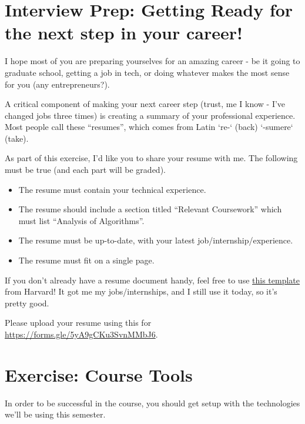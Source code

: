 \documentclass [12pt]{article}
\begin{document}

\pagebreak
\section{Interview Prep: Getting Ready for the next step in your career!}
 I hope most of you are preparing yourselves for an amazing career - be it going to graduate school, getting a job in tech, or doing whatever makes the most sense for you (any entrepreneurs?).

A critical component of making your next career step (trust, me I know - I've changed jobs three times) is creating a summary of your professional experience. Most people call these ``resumes'', which comes from Latin `re-` (back) `-sumere` (take).

As part of this exercise, I'd like you to share your resume with me. The following must be true (and each part will be graded).

\begin{itemize}
    \item {} The resume must contain your technical experience.
    \item {} The resume should include a section titled ``Relevant Coursework'' which must list ``Analysis of Algorithms''. 
    \item {} The resume must be up-to-date, with your latest job/internship/experience.
    \item {} The resume must fit on a single page. 
\end{itemize}

If you don't already have a resume document handy, feel free to use \href{http://hwpi.harvard.edu/files/ocs/files/template_bullet.doc}{this template} from Harvard! It got me my jobs/internships, and I still use it today, so it's pretty good.

Please upload your resume using this for \href{https://forms.gle/5yA9gCKu3SvnMMbJ6}{https://forms.gle/5yA9gCKu3SvnMMbJ6}.


\section{Exercise: Course Tools}
 In order to be successful in the course, you should get setup with the technologies we'll be using this semester. 
\end{document}
